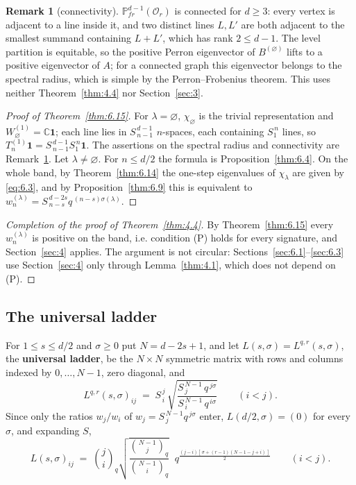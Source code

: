 \documentclass[11pt]{article}
\numberwithin{equation}{section}
\theoremstyle{plain}
\theoremstyle{definition}
\newtheorem{remark}[theorem]{Remark}
\begin{document}
\begin{remark}[connectivity]\label{thm:6.17}
$\mathbb{P}^{d-1}_{fr}(\mathcal{O}_r)$ is connected for $d\ge3$:
every vertex is adjacent to a line inside it, and two distinct lines $L,L'$ are both
adjacent to the smallest summand containing $L+L'$, which has rank $2\le d-1$. The
level partition is equitable, so the positive Perron eigenvector of
$B^{(\varnothing)}$ lifts to a positive eigenvector of $A$; for a connected graph this
eigenvector belongs to the spectral radius, which is simple by the Perron--Frobenius
theorem. This uses neither Theorem~\ref{thm:4.4} nor Section~\ref{sec:3}.
\end{remark}

\begin{proof}[Proof of Theorem~\ref{thm:6.15}]
For $\lambda=\varnothing$, $\chi_\varnothing$ is the trivial representation and
$W^{(1)}_\varnothing=\mathbb{C}\mathbf 1$; each line lies in $S^{\,d-1}_{\,n-1}$
$n$-spaces, each containing $S^{\,n}_1$ lines, so
$T^{(1)}_n\mathbf 1=S^{\,d-1}_{\,n-1}S^{\,n}_1\mathbf 1$. The assertions on the spectral
radius and connectivity are Remark~\ref{thm:6.17}. Let $\lambda\ne\varnothing$. For $n\le d/2$ the formula is
Proposition~\ref{thm:6.4}. On the whole band, by Theorem~\ref{thm:6.14} the one-step
eigenvalues of $\chi_\lambda$ are given by \eqref{eq:6.3}, and by Proposition~\ref{thm:6.9} this is
equivalent to $w^{(\lambda)}_n=S^{\,d-2s}_{\,n-s}q^{\,(n-s)\sigma(\lambda)}$.
\end{proof}

\begin{proof}[Completion of the proof of Theorem~\ref{thm:4.4}]
By Theorem~\ref{thm:6.15} every $w^{(\lambda)}_n$ is positive on the band,
i.e. condition (P) holds for every signature, and Section~\ref{sec:4} applies. The argument is
not circular: Sections~\ref{sec:6.1}--\ref{sec:6.3} use Section~\ref{sec:4} only through Lemma~\ref{thm:4.1}, which does not depend
on (P).
\end{proof}

\subsection{The universal ladder}\label{sec:6.5}

For $1\le s\le d/2$ and $\sigma\ge0$ put $N=d-2s+1$, and let $L(s,\sigma)=L^{q,r}(s,\sigma)$,
the \textbf{universal ladder}, be the $N\times N$ symmetric matrix with rows and columns
indexed by $0,\dots,N-1$, zero diagonal, and
\begin{equation}\label{eq:L}
L^{q,r}(s,\sigma)_{ij}\;=\;S^{\,j}_{\,i}\,\sqrt{\frac{S^{\,N-1}_{\,j}\,q^{\,j\sigma}}
{S^{\,N-1}_{\,i}\,q^{\,i\sigma}}}\qquad(i<j).
\end{equation}
Since only the
ratios $w_j/w_i$ of $w_j=S^{\,N-1}_{\,j}q^{\,j\sigma}$ enter, $L(d/2,\sigma)=(0)$ for every
$\sigma$, and expanding $S$,
\begin{equation}\label{eq:6.5}
L(s,\sigma)_{ij}\;=\;\binom{j}{i}_q\sqrt{\frac{\binom{N-1}{j}_q}{\binom{N-1}{i}_q}}\;\;
q^{\frac{(j-i)\left[\,\sigma+(r-1)(N-1-j+i)\,\right]}{2}}\qquad(i<j).
\end{equation}
\end{document}
